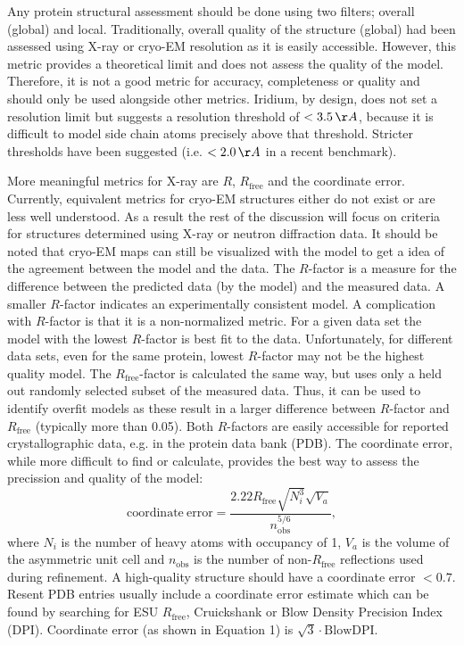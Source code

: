 \documentclass[9pt,bestpractices]{livecoms}
\begin{document}
Any protein structural assessment should be done using two filters; overall (global) and local. Traditionally, overall quality of the structure (global) had been assessed using X-ray or cryo-EM resolution as it is easily accessible.
%
However, this metric provides a theoretical limit and does not assess the quality of the model. Therefore, it is not a good metric for accuracy, completeness or quality and should only be used alongside other metrics. Iridium, by design, does not set a resolution limit but suggests a resolution threshold of $< 3.5\,\AA$,\cite{warrenEssentialConsiderationsUsing2012} because it is difficult to model side chain atoms precisely above that threshold. Stricter thresholds have been suggested (i.e. $<2.0\,\AA$  in a recent benchmark\cite{schindler_largescale_2020}).

More meaningful metrics for X-ray are $R$, $R_{\mathrm{free}}$ and the coordinate error. Currently, equivalent metrics for cryo-EM structures either do not exist or are less well understood.  As a result the rest of the discussion will focus on criteria for structures determined using X-ray or neutron diffraction data.  It should be noted that cryo-EM maps can still be visualized with the model to get a idea of the agreement between the model and the data.
%
The $R$-factor is a measure for the difference between the predicted data (by the model) and the measured data. A smaller $R$-factor indicates an experimentally consistent model. A complication with $R$-factor is that it is a non-normalized metric. For a given data set the model with the lowest $R$-factor is best fit to the data.  Unfortunately, for different data sets, even for the same protein, lowest $R$-factor may not be the highest quality model. 
%
The $R_{\mathrm{free}}$-factor is calculated the same way, but uses only a held out randomly selected subset of the measured data. Thus, it can be used to identify overfit models as these result in a larger difference between $R$-factor and $R_{\mathrm{free}}$ (typically more than 0.05).
Both $R$-factors are easily accessible for reported crystallographic data, e.g. in the protein data bank (PDB).\cite{bermanProteinDataBank2000} 
%
The coordinate error, while more difficult to find or calculate, provides the best way to assess the precission and quality of the model:
%
\begin{equation}
    \mathrm{coordinate\ error} = \frac{2.22 R_{\mathrm{free}}\sqrt{N_i^3}\sqrt{V_a}} {n_{\mathrm{obs}}^{5/6}},
    \label{eq:coordinate_error}
\end{equation}
%
where $N_i$ is the number of heavy atoms with occupancy of 1, $V_a$ is the volume of the asymmetric unit cell and $n_{\mathrm{obs}}$ is the number of non-$R_{\mathrm{free}}$ reflections used during refinement. A high-quality structure should have a coordinate error $<0.7$. Resent PDB entries usually include a coordinate error estimate which can be found by searching for ESU $R_{\mathrm{free}}$, Cruickshank or Blow Density Precision Index (DPI). Coordinate error (as shown in Equation 1) is $\sqrt{3}\cdot \mathrm{BlowDPI}$. 
\end{document}
